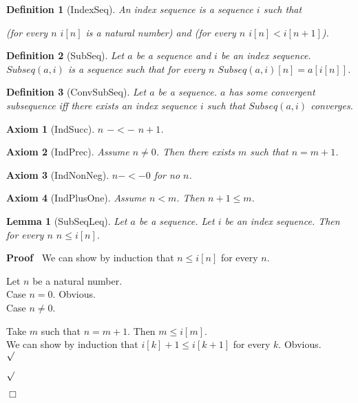 \documentclass{article}
\newenvironment{forthel}{\begin{leftbar}}{\end{leftbar}}
\newenvironment{proof}{\noindent\textbf{Proof\ }}{\hspace*{\fill}$\Box$\medskip}
\newenvironment{subproof}{\begin{list}{}{}
		\item[\text{Proof}]}{\hfill $\surd$ \end{list}}
\newenvironment{case}{\begin{list}{}{}
		\item[]}{\hfill $\surd$ \end{list}}
\newtheorem{axiom}{Axiom}
\newtheorem{lemma}{Lemma}
\newtheorem{definition}{Definition}
\begin{document}
\begin{forthel}
	
	\begin{definition}[IndexSeq]
		An index sequence is a sequence $i$ such that
		
		(for every $n$ $i[n]$ is a natural number) and (for every $n$ $i[n] < i[n + 1]$).
	\end{definition}
	
	\begin{definition}[SubSeq]
		Let $a$ be a sequence and $i$ be an index sequence. $Subseq(a,i)$ is a sequence such that for every $n$
		$Subseq(a,i)[n] = a[i[n]]$.
	\end{definition}
	
	\begin{definition}[ConvSubSeq]
		Let $a$ be a sequence. $a$ has some convergent subsequence iff there exists an index sequence $i$ such that $Subseq(a,i)$ converges.
	\end{definition}
	
	\begin{axiom}[IndSucc]
		$n$ $-<-$ $n + 1$. 
	\end{axiom}
	
	\begin{axiom}[IndPrec]
		Assume $n \neq 0$. Then there exists $m$ such that $n = m + 1$.
	\end{axiom}
	
	\begin{axiom}[IndNonNeg]
		$n -<- 0$ for no $n$.
	\end{axiom}
	
	\begin{axiom}[IndPlusOne]
		Assume $n < m$. Then $n + 1 \leq m$.
	\end{axiom}
	
	\begin{lemma}[SubSeqLeq]
		Let $a$ be a sequence. Let $i$ be an index sequence. Then for every $n$ $n \leq i[n]$.
	\end{lemma}
	
	\begin{proof}
		We can show by induction that $n \leq i[n]$ for every $n$.
		\begin{subproof}
			Let $n$ be a natural number.\\
			Case $n = 0$. Obvious.\\
			Case $n \neq 0$.\\ 
			\begin{case}
				Take $m$ such that $n = m + 1$. Then $m \leq i[m]$.\\
				We can show by induction that $i[k] + 1 \leq i[k + 1]$ for every $k$. Obvious.\\
			\end{case}
		\end{subproof}
	\end{proof}
	

\end{forthel}
\end{document}
